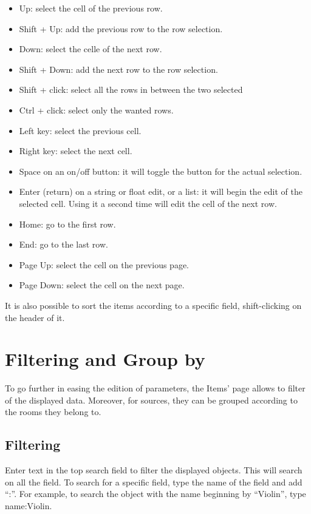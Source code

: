 \documentclass[
  letterpaper,
  DIV=11,
  numbers=noendperiod]{scrreport}
\providecommand{\tightlist}{%
  \setlength{\itemsep}{0pt}\setlength{\parskip}{0pt}}\usepackage{longtable,booktabs,array}
\begin{document}
\begin{itemize}
\tightlist
\item
  Up: select the cell of the previous row.
\item
  Shift + Up: add the previous row to the row selection.
\item
  Down: select the celle of the next row.
\item
  Shift + Down: add the next row to the row selection.
\item
  Shift + click: select all the rows in between the two selected
\item
  Ctrl + click: select only the wanted rows.
\item
  Left key: select the previous cell.
\item
  Right key: select the next cell.
\item
  Space on an on/off button: it will toggle the button for the actual
  selection.
\item
  Enter (return) on a string or float edit, or a list: it will begin the
  edit of the selected cell. Using it a second time will edit the cell
  of the next row.
\item
  Home: go to the first row.
\item
  End: go to the last row.
\item
  Page Up: select the cell on the previous page.
\item
  Page Down: select the cell on the next page.
\end{itemize}

It is also possible to sort the items according to a specific field,
shift-clicking on the header of it.

\hypertarget{filtering-and-group-by}{%
\section{Filtering and Group by}\label{filtering-and-group-by}}

To go further in easing the edition of parameters, the Items' page
allows to filter of the displayed data. Moreover, for sources, they can
be grouped according to the rooms they belong to.

\hypertarget{filtering}{%
\subsection{Filtering}\label{filtering}}

Enter text in the top search field to filter the displayed objects. This
will search on all the field. To search for a specific field, type the
name of the field and add ``:''. For example, to search the object with
the name beginning by ``Violin'', type name:Violin.
\end{document}
